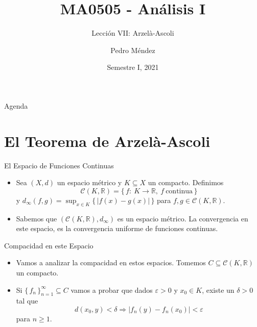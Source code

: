 \documentclass[utf8]{beamer}
\title[MA0505]{MA0505 - An\'alisis I}
\subtitle{Lecci\'on VII: Arzelà-Ascoli}
\author{Pedro M\'endez\inst{1}}
\institute[Universidad de Costa Rica] %
{
  \inst{1}%
  Departmento de Matem\'atica Pura y Ciencias Actuariales\\
  Universidad de Costa Rica
  }
\date[I-2021] {Semestre I, 2021}
\theoremstyle{plain}
\theoremstyle{definition}
\theoremstyle{remark}
\numberwithin{equation}{section}
\newcommand{\dl}{\delta}                %
\newcommand{\eps}{\varepsilon}          %
\newcommand{\bR}{\mathbb{R}}    %
\newcommand{\cC}{\mathcal{C}}           %
\newcommand{\set}[1]{\{\,#1\,\}}    %
\renewcommand{\geq}{\geqslant}          %
\newcommand{\To}{\Rightarrow}
\newcommand{\sucn}{_{n=1}^\infty} %
\begin{document}
\begin{frame}
  \titlepage
\end{frame}

\begin{frame}{Agenda}
  \tableofcontents
\end{frame}





\section{El Teorema de Arzelà-Ascoli}

\begin{frame}{El Espacio de Funciones Continuas}
  \begin{itemize}
    \item Sea $(X,d)$ un espacio métrico y $K\subseteq X$ un compacto. Definimos 
    $$\cC(K,\bR)=\set{f:\ K\to\bR,\ f\ \text{continua}}$$
    y $d_\infty(f,g)=\sup_{x\in K} \set{|f(x)-g(x)|}$ para $f,g\in\cC(K,\bR)$.\par 
  \item  Sabemos que $(\cC(K,\bR),d_\infty)$ es un espacio métrico. La convergencia en este espacio, es la convergencia uniforme de funciones continuas.   
  \end{itemize}
 
\end{frame}

\begin{frame}{Compacidad en este Espacio}
  \begin{itemize}
    \item Vamos a analizar la compacidad en estos espacios. Tomemos $C\subseteq\cC(K,\bR)$ un compacto.
    \item Si $\set{f_n}\sucn\subseteq C$ vamos a probar que dados $\eps>0$ y $x_0\in K$, existe un $\dl>0$ tal que 
    $$d(x_0,y)<\dl\To|f_n(y)-f_n(x_0)|<\eps$$
    para $n\geq 1$.
  \end{itemize}
\end{frame}
\end{document}
